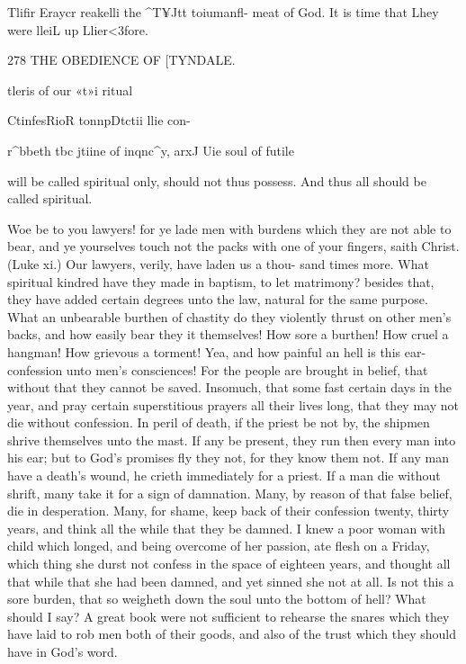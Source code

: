 \documentclass{custom}
\begin{document}
{Tlifir 
Eraycr 
reakelli 
the ^T¥Jtt 
toiumanfl- 
meat of 
God. It is 
time that 
Lhey were 
lleiL up 
Llier<3fore. 


278
THE OBEDIENCE OF
[TYNDALE.

tleris of our 
«t»i ritual 

CtinfesRioR 
tonnpDtctii 
llie con- 

r^bbeth tbc 
jtiine of 
inqnc^y, 
arxJ Uie 
soul of 
futile 

will be called spiritual only, should not thus possess. 
And thus all should be called spiritual. 

Woe be to you lawyers! for ye lade men with burdens 
which they are not able to bear, and ye yourselves touch 
not the packs with one of your fingers, saith Christ. 
(Luke xi.) Our lawyers, verily, have laden us a thou- 
sand times more. What spiritual kindred have they 
made in baptism, to let matrimony? besides that, they 
have added certain degrees unto the law, natural for the 
same purpose. What an unbearable burthen of chastity 
do they violently thrust on other men's backs, and how 
easily bear they it themselves! How sore a burthen! 
How cruel a hangman! How grievous a torment! Yea, 
and how painful an hell is this ear-confession unto men's 
consciences! For the people are brought in belief, that 
without that they cannot be saved. Insomuch, that some 
fast certain days in the year, and pray certain superstitious 
prayers all their lives long, that they may not die without 
confession. In peril of death, if the priest be not by, the 
shipmen shrive themselves unto the mast. If any be 
present, they run then every man into his ear; but to 
God's promises fly they not, for they know them not. If 
any man have a death's wound, he crieth immediately for 
a priest. If a man die without shrift, many take it for a 
sign of damnation. Many, by reason of that false belief, 
die in desperation. Many, for shame, keep back of their 
confession twenty, thirty years, and think all the while 
that they be damned. I knew a poor woman with child 
which longed, and being overcome of her passion, ate 
flesh on a Friday, which thing she durst not confess in 
the space of eighteen years, and thought all that while 
that she had been damned, and yet sinned she not at all. 
Is not this a sore burden, that so weigheth down the soul 
unto the bottom of hell? What should I say? A great 
book were not sufficient to rehearse the snares which they 
have laid to rob men both of their goods, and also of the 
trust which they should have in God's word. 


}
\end{document}
